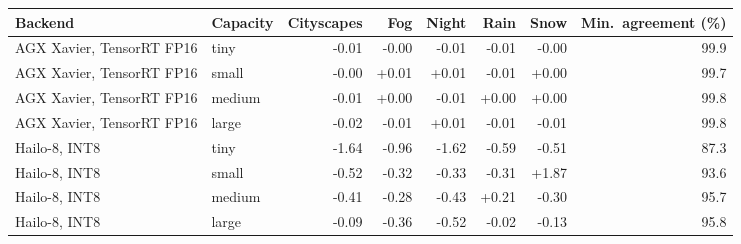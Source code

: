 \begin{tabular}{@{}llrrrrrr@{}}
\toprule
Backend & Capacity & Cityscapes & Fog & Night & Rain & Snow & Min.\ agreement (\%) \\
\midrule
AGX Xavier, TensorRT FP16 & tiny & -0.01 & -0.00 & -0.01 & -0.01 & -0.00 & 99.9 \\
AGX Xavier, TensorRT FP16 & small & -0.00 & +0.01 & +0.01 & -0.01 & +0.00 & 99.7 \\
AGX Xavier, TensorRT FP16 & medium & -0.01 & +0.00 & -0.01 & +0.00 & +0.00 & 99.8 \\
AGX Xavier, TensorRT FP16 & large & -0.02 & -0.01 & +0.01 & -0.01 & -0.01 & 99.8 \\
\midrule
Hailo-8, INT8 & tiny & -1.64 & -0.96 & -1.62 & -0.59 & -0.51 & 87.3 \\
Hailo-8, INT8 & small & -0.52 & -0.32 & -0.33 & -0.31 & +1.87 & 93.6 \\
Hailo-8, INT8 & medium & -0.41 & -0.28 & -0.43 & +0.21 & -0.30 & 95.7 \\
Hailo-8, INT8 & large & -0.09 & -0.36 & -0.52 & -0.02 & -0.13 & 95.8 \\
\bottomrule
\end{tabular}
